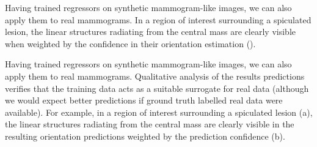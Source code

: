 Having trained regressors on synthetic mammogram-like images, we can also apply them to real mammograms. In a region of interest surrounding a spiculated lesion, the linear structures radiating from the central mass are clearly visible when weighted by the confidence in their orientation estimation ().

Having trained regressors on synthetic mammogram-like images, we can also apply them to real mammograms. Qualitative analysis of the results predictions verifies that the training data acts as a suitable surrogate for real data (although we would expect better predictions if ground truth labelled real data were available). For example, in a region of interest surrounding a spiculated lesion (a), the linear structures radiating from the central mass are clearly visible in the resulting orientation predictions weighted by the prediction confidence (b).


